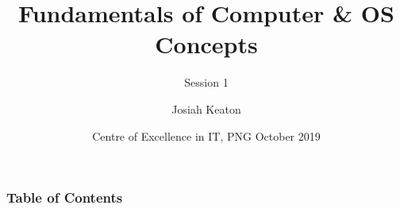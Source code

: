\documentclass[hyperref={bookmarks=false},aspectratio=169]{beamer}
\title[Contents]
{\bfseries{Fundamentals of Computer \& OS Concepts}}
\subtitle{Session 1}
\author[] %
{Josiah Keaton\inst{1} } %
\institute[CEIT]
{
  \inst{1}
  Trainer\\
  Centre of Excellence in IT,PNG
}
\date[CEIT, 2014]
{Centre of Excellence in IT, PNG October 2019}
\begin{document}
\frame{\titlepage}  %

\begin{frame}
\frametitle{Table of Contents}
\tableofcontents
\end{frame}











%
%

%
\end{document}
